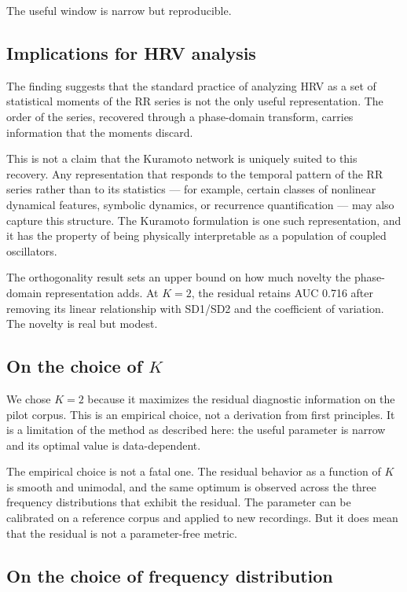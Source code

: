\documentclass[11pt]{article}
\begin{document}
The useful window is narrow but reproducible.

\subsection{Implications for HRV analysis}

The finding suggests that the standard practice of analyzing HRV as a
set of statistical moments of the RR series is not the only useful
representation. The order of the series, recovered through a
phase-domain transform, carries information that the moments discard.

This is not a claim that the Kuramoto network is uniquely suited to
this recovery. Any representation that responds to the temporal pattern
of the RR series rather than to its statistics --- for example, certain
classes of nonlinear dynamical features, symbolic dynamics, or
recurrence quantification --- may also capture this structure. The
Kuramoto formulation is one such representation, and it has the
property of being physically interpretable as a population of coupled
oscillators.

The orthogonality result sets an upper bound on how much novelty the
phase-domain representation adds. At $K = 2$, the residual retains AUC
0.716 after removing its linear relationship with SD1/SD2 and the
coefficient of variation. The novelty is real but modest.

\subsection{On the choice of $K$}

We chose $K = 2$ because it maximizes the residual diagnostic
information on the pilot corpus. This is an empirical choice, not a
derivation from first principles. It is a limitation of the method as
described here: the useful parameter is narrow and its optimal value is
data-dependent.

The empirical choice is not a fatal one. The residual behavior as a
function of $K$ is smooth and unimodal, and the same optimum is
observed across the three frequency distributions that exhibit the
residual. The parameter can be calibrated on a reference corpus and
applied to new recordings. But it does mean that the residual is not a
parameter-free metric.

\subsection{On the choice of frequency distribution}
\end{document}
